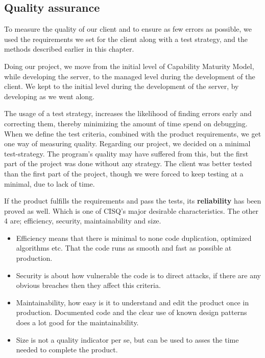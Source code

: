 \subsection{Quality assurance}
To measure the quality of our client and to ensure as few errors as possible, we used the requirements we set for the client along with a test strategy, and the methods described earlier in this chapter. 

Doing our project, we move from the initial level of Capability Maturity Model, while developing the server, to the managed level during the development of the client. We kept to the initial level during the development of the server, by developing as we went along.

The usage of a test strategy, increases the likelihood of finding errors early and correcting them, thereby minimizing the amount of time spend on debugging. When we define the test criteria, combined with the product requirements, we get one way of measuring quality.
Regarding our project, we decided on a minimal test-strategy. The program's quality may have suffered from this, but the first part of the project was done without any strategy. The client was better tested than the first part of the project, though we were forced to keep testing at a minimal, due to lack of time.

If the product fulfills the requirements and pass the tests, its \textbf{reliability} has been proved as well. Which is one of CISQ's  major desirable characteristics. The other 4 are; efficiency, security, maintainability and size.
\begin{itemize}
	\item Efficiency means that there is minimal to none code duplication, optimized algorithms etc. That the code runs as smooth and fast as possible at production.
	\item Security is about how vulnerable the code is to direct attacks, if there are any obvious breaches then they affect this criteria.
	\item Maintainability, how easy is it to understand and edit the product once in production. Documented code and the clear use of known design patterns does a lot good for the maintainability. 
	\item Size is not a quality indicator per se, but can be used to asses the time needed to complete the product.\\ 
\end{itemize}



